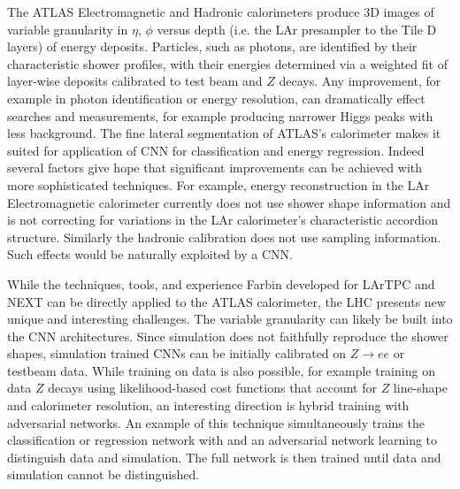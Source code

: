 

The ATLAS Electromagnetic and Hadronic calorimeters produce 3D images
of variable granularity in $\eta$, $\phi$ versus depth (i.e. the LAr
presampler to the Tile D layers) of energy deposits. Particles, such
as photons, are identified by their characteristic shower profiles,
with their energies determined via a weighted fit of layer-wise
deposits calibrated to test beam and $Z$ decays. Any improvement, for
example in photon identification or energy resolution, can
dramatically effect searches and measurements, for example producing
narrower Higgs peaks with less background. The fine lateral
segmentation of ATLAS's calorimeter makes it suited for application of
CNN for classification and energy regression. Indeed several factors
give hope that significant improvements can be achieved with more
sophisticated techniques. For example, energy reconstruction in the
LAr Electromagnetic calorimeter currently does not use shower shape
information and is not correcting for variations in the LAr
calorimeter's characteristic accordion structure. Similarly the
hadronic calibration does not use sampling information. Such effects
would be naturally exploited by a CNN.

While the techniques, tools, and experience Farbin developed for
LArTPC and NEXT can be directly applied to the ATLAS calorimeter, the
LHC presents new unique and interesting challenges. The variable
granularity can likely be built into the CNN architectures. Since
simulation does not faithfully reproduce the shower shapes, simulation
trained CNNs can be initially calibrated on $Z\rightarrow e e$ or
testbeam data. While training on data is also possible, for example
training on data $Z$ decays using likelihood-based cost functions that
account for $Z$ line-shape and calorimeter resolution, an interesting
direction is hybrid training with adversarial networks. An example of
this technique simultaneously trains the classification or regression
network with and an adversarial network learning to distinguish data
and simulation. The full network is then trained until data and
simulation cannot be distinguished.

